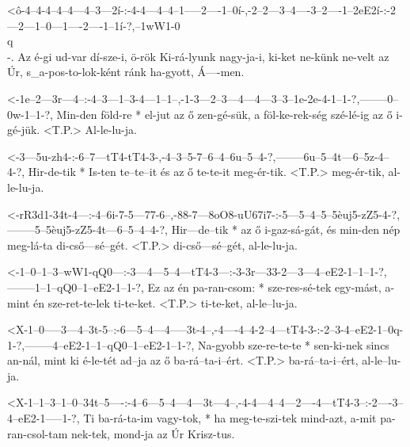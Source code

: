   {<ô-4--4-4--4--4---4--3---2í-:-4-4---4--4--1-----2----1--0í-,-2--2---3--4----3--2----1--2eE2í-:-2---2---1--0---1----2----1--1í-?,--1wW1-0\\q\\-.}
  {   Az é-gi ud-var dí-sze-i,   ö-rök Ki-rá-lyunk nagy-ja-i,   ki-ket ne-künk ne-velt az Úr,     s_a-pos-to-lok-ként ránk ha-gyott, Á----men.}

  {<-1e--2---3r---4--:-4--3---1--3-4---1--1--,-1-3---2--3---4---4---3--3--1e-2e-4-1--1-?,--------0--0w-1--1-?,}
  {  Min-den föld-re * el-jut az ő zen-gé-sük, a föl-ke-rek-ség szé-lé-ig az ő  i-gé-jük. <T.P.> Al-le-lu-ja.}

  {<-3---5u-zh4-:-6--7---tT4-tT4-3-,-4--3--5-7--6--4--6u--5--4-?,--------6u--5--4t---6--5z-4--4-?,}
  {  Hir-de-tik * Is-ten te--te--it  és az ő te-te-it meg-ér-tik. <T.P.> meg-ér-tik, al-le-lu-ja.}

  {<-rR3d1-34t-4---:-4--6i-7-5---77-6--,-88-7---8oO8-uU67i7-:-5---5--4--5--5èuj5-zZ5-4-?,--------5--5èuj5-zZ5-4t---6--5--4--4-?,}
  {  Hir---de--tik * az ő  i-gaz-sá-gát, és min-den  nép      meg-lá-ta di-cső---sé--gét. <T.P.> di-cső---sé--gét, al-le-lu-ja.}


  {<-1--0--1--3--wW1-qQ0---:-3---4---5--4---tT4-3---:-3-3r---33-2---3---4--eE2-1--1--1-?,--------1--1--qQ0--1--eE2-1--1-?,}
  {  Ez az én pa-ran-csom: * sze-res-sé-tek egy-mást, a-mint én sze-ret-te-lek ti-te-ket. <T.P.> ti-te-ket, al-le--lu-ja.}

  {<X-1--0-----3---4--3t-5--:-6---5--4---4-----3t-4--,-4----4--4-2--4---tT4-3-:-2--3-4--eE2-1--0q-1-?,--------4--eE2-1--1--qQ0--1--eE2-1--1-?,}
  {   Na-gyobb sze-re-te-te * sen-ki-nek sincs an-nál, mint ki é-le-tét ad--ja  az ő ba-rá--ta-i--ért. <T.P.> ba-rá--ta-i--ért, al-le--lu-ja.}

  {<X-1--1--3--1--0--34t--5----:-4--6---5--4---4---3t---4--,-4-4---4--4---2----4---tT4-3--:-2----3--4--eE2-1-----1-?,}
  {   Ti ba-rá-ta-im vagy-tok, * ha meg-te-szi-tek mind-azt, a-mit pa-ran-csol-tam nek-tek, mond-ja az Úr  Krisz-tus.}


